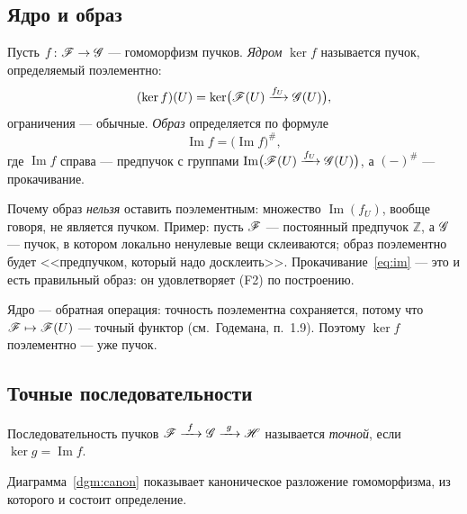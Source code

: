 
\subsection{Ядро и образ}
\leavevmode\par
\begin{defn}
Пусть $f\colon\mathscr{F}\to\mathscr{G}$ --- гомоморфизм пучков.
\emph{Ядром} $\ker f$ называется пучок, определяемый поэлементно:
\begin{equation}\label{eq:ker}
 (\ker f)(U)=\ker\bigl(\mathscr{F}(U)\xrightarrow{f_U}\mathscr{G}(U)\bigr),
\end{equation}
ограничения --- обычные. \emph{Образ} определяется по формуле
\begin{equation}\label{eq:im}
 \operatorname{Im}f=\bigl(\operatorname{Im}f\bigr)^{\#},
\end{equation}
где $\operatorname{Im}f$ справа --- предпучок с группами
$\operatorname{Im}\bigl(\mathscr{F}(U)\xrightarrow{f_U}\mathscr{G}(U)\bigr)$,
а $({-})^{\#}$ --- прокачивание.
\end{defn}

Почему образ \emph{нельзя} оставить поэлементным: множество
$\operatorname{Im}(f_U)$, вообще говоря, не является пучком. Пример:
пусть $\mathscr{F}$ --- постоянный предпучок $\mathbb{Z}$, а
$\mathscr{G}$ --- пучок, в котором локально ненулевые вещи склеиваются;
образ поэлементно будет <<предпучком, который надо досклеить>>.
Прокачивание~\eqref{eq:im} --- это и есть правильный образ: он
удовлетворяет (F2) по построению.

\begin{rem}
Ядро --- обратная операция: точность поэлементна сохраняется, потому
что $\mathscr{F}\mapsto\mathscr{F}(U)$ --- точный функтор (см.~Годемана,
п.~1.9). Поэтому $\ker f$ поэлементно --- уже пучок.
\end{rem}

\subsection{Точные последовательности}
\leavevmode\par
\begin{defn}
Последовательность пучков
$\Shv{F}\xrightarrow{\ f\ }\Shv{G}\xrightarrow{\ g\ }\Shv{H}$
называется \emph{точной}, если $\ker g=\operatorname{Im}f$.
\end{defn}

Диаграмма~\ref{dgm:canon} показывает каноническое разложение
гомоморфизма, из которого и состоит определение.


